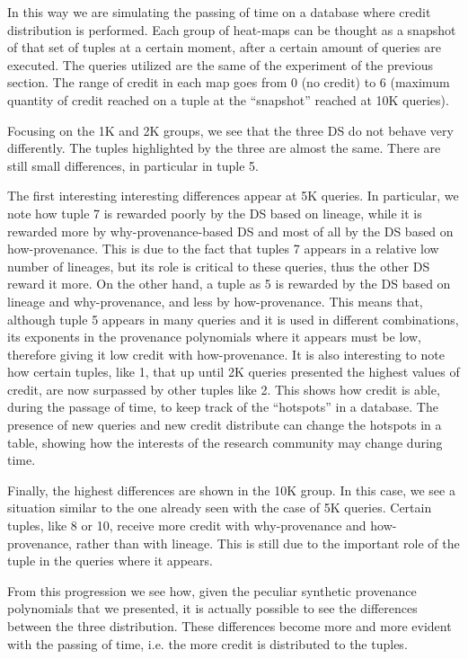 In this way we are simulating the passing of time on a database where credit distribution is performed. Each group of heat-maps can be thought as a snapshot of that set of tuples at a certain moment, after a certain amount of queries are executed. 
The queries utilized are the same of the experiment of the previous section. The range of credit in each map goes from 0 (no credit) to 6 (maximum quantity of credit reached on a tuple at the ``snapshot'' reached at 10K queries).

Focusing on the 1K and 2K groups, we see that the three DS do not behave very differently. The tuples highlighted by the three are almost the same. There are still small differences, in particular in tuple 5.

The first interesting interesting differences appear at 5K queries. In particular, we note how tuple 7 is rewarded poorly by the DS based on lineage, while it is rewarded more by why-provenance-based DS and most of all by the DS based on how-provenance. This is due to the fact that tuples 7 appears in a relative low number of lineages, but its role is critical to these queries, thus the other DS reward it more.
On the other hand, a tuple as 5 is rewarded by the DS based on lineage and why-provenance, and less by how-provenance. This means that, although tuple 5 appears in many queries and it is used in different combinations, its exponents in the provenance polynomials where it appears must be low, therefore giving it low credit with how-provenance.
It is also interesting to note how certain tuples, like 1, that up until 2K queries presented the highest values of credit, are now surpassed by other tuples like 2. This shows how credit is able, during the passage of time, to keep track of the ``hotspots'' in a database. The presence of new queries and new credit distribute can change the hotspots in a table, showing how the interests of the research community may change during time. 

Finally, the highest differences are shown in the 10K group. In this case, we see a situation similar to the one already seen with the case of 5K queries. Certain tuples, like 8 or 10, receive more credit with why-provenance and how-provenance, rather than with lineage. This is still due to the important role of the tuple in the queries where it appears. 

From this progression we see how, given the peculiar synthetic provenance polynomials that we presented, it is actually possible to see the differences between the three distribution. These differences become more and more evident with the passing of time, i.e. the more credit is distributed to the tuples. 

